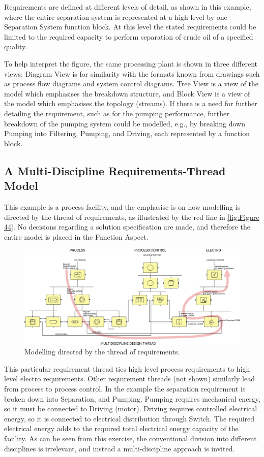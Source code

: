 \documentclass[../main.tex]{subfiles}
\begin{document}
Requirements are defined at different levels of detail, as shown in this example, where the entire separation system
is represented at a high level by one Separation System function block. At this level the stated
requirements could be limited to the required capacity to perform separation of crude oil of a specified quality.

To help interpret the figure, the same processing plant is shown in three different views: Diagram View is for
similarity with the formats known from drawings such as process flow diagrams and system control diagrams. Tree View is a view of the model which emphasises the breakdown structure, and Block View is a view of the
model which emphasises the topology (streams). If there is a need for further detailing the requirement, such as for
the pumping performance, further breakdown of the pumping system could be modelled, e.g., by breaking down Pumping
into Filtering, Pumping, and Driving, each represented by a function block.

\subsection{A Multi-Discipline Requirements-Thread Model}
This example is a process facility, and the emphasise is on how modelling is directed by
the thread of requirements, as illustrated by the red line in \autoref{fig:Figure 44}. No decisions regarding a solution
specification are made, and therefore the entire model is placed in the Function Aspect.

\begin{figure}[htb]\centering
  \includegraphics[width=1\textwidth]{img/IMFmanual-img063.png}
  \caption{Modelling directed by the thread of requirements.}
  \label{fig:Figure 44}
\end{figure}

This particular requirement thread ties high level process requirements to high level electro requirements. Other
requirement threads (not shown) similarly lead from process to process control. In the example the separation
requirement is broken down into Separation, and Pumping. Pumping requires mechanical energy, so it must be connected
to Driving (motor). Driving requires controlled electrical energy, so it is connected to electrical distribution
through Switch. The required electrical energy adds to the required total electrical energy capacity of the
facility. As can be seen from this exercise, the conventional division into different disciplines is irrelevant, and
instead a multi-discipline approach is invited.
\end{document}

